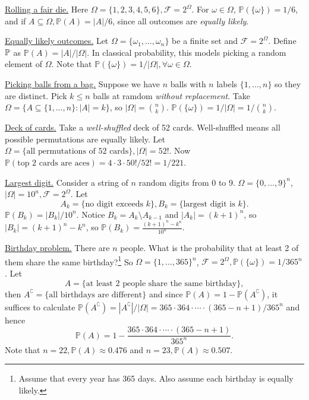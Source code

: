 \begin{example}
    \underline{Rolling a fair die.} Here $ \Omega = \{1,2,3,4,5,6\}, \mathcal{F} = 2^\Omega $. For $ \omega\in \Omega$, $\mathbb{P}(\{\omega\})=1/6 $, and if $ A \subseteq \Omega, \mathbb{P}(A)=|A|/6 $, since all outcomes are \textit{equally likely}.
\end{example}
\begin{example}
    \underline{Equally likely outcomes.} Let $ \Omega = \{\omega_1,\dots, \omega_n\} $ be a finite set and $ \mathcal{F}=2^\Omega $. Define ${\mathbb{P}}$ as $ \mathbb{P}(A)=|A|/|\Omega| $. In classical probability, this models picking a random element of $ \Omega $. Note that $ \mathbb{P}(\{\omega\})=1/|\Omega|, \forall \omega\in \Omega $.
\end{example}
\begin{example}
    \underline{Picking balls from a bag.} Suppose we have $n$ balls with $n$ labels $ \{1,\dots,n\} $ so they are distinct. Pick $k\le n$ balls at ramdom \textit{without replacement}. Take $ \Omega = \{A \subseteq \{1,\dots,n\}: |A|=k\} $, so $ |\Omega|=\binom{n}{k} $. $ \mathbb{P}(\{\omega\}) = 1/|\Omega| = 1/\binom{n}{k} $.
\end{example}
\begin{example}
    \underline{Deck of cards.} Take a \textit{well-shuffled} deck of 52 cards. Well-shuffled means all possible permutations are equally likely. Let $ \Omega = \{\text{all permutations of 52 cards}\}, |\Omega|=52! $. Now $ \mathbb{P}(\text{top 2 cards are aces}) = 4 \cdot 3 \cdot 50!/52! = 1/221$.
\end{example}
\begin{example}
    \underline{Largest digit.} Consider a string of $n$ random digits from 0 to 9. $ \Omega = \{0,\dots,9\}^n $, $ |\Omega| = 10^n, \mathcal{F}=2^\Omega  $. Let 
    \[
         A_k = \{\text{no digit exceeds }k\}, B_k =\{\text{largest digit is }k\} .
    \]
    $ \mathbb{P}(B_k) = |B_k|/10^n $. Notice $ B_k = A_k \setminus A_{k-1} $ and $ |A_k| = (k+1)^n $, so $ |B_k|=(k+1)^n-k^n $, so $ \mathbb{P}(B_k) = \frac{(k+1)^n-k^n}{10^n} $.
\end{example}
\begin{example}
    \underline{Birthday problem.} There are $n$ people. What is the probability that at least 2 of them share the same birthday?\footnote{Assume that every year has 365 days. Also assume each birthday is equally likely.} So $ \Omega = \{1,\dots,365\}^n $, $ \mathcal{F} = 2^\Omega, \mathbb{P}(\{\omega\}) = 1/365^n $. Let 
    \[
        A=\{\text{at least 2 people share the same birthday}\} ,
    \]
     then $ A^\complement = \{\text{all birthdays are different}\} $ and since $ \mathbb{P}(A)=1-\mathbb{P}(A^\complement) $, it suffices to calculate $ \mathbb{P}(A^\complement) = |A^\complement|/|\Omega| = 365 \cdot 364 \cdot \cdots \cdot (365-n+1)/365^n $ and hence 
    \[
        \mathbb{P}(A) = 1-\frac{365 \cdot 364 \cdot \cdots \cdot (365-n+1)}{365^n}.
    \]
    Note that $n=22, \mathbb{P}(A) \approx 0.476$ and $ n=23, \mathbb{P}(A)\approx 0.507 $. 
\end{example}

